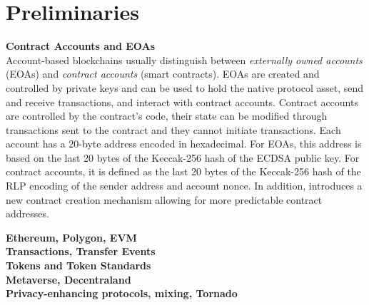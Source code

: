 \documentclass[12pt,a4paper,titlepage,oneside,english]{article}
\begin{document}




\section{Preliminaries}

\textbf{Contract Accounts and EOAs}\\
Account-based blockchains usually distinguish between \textit{externally owned accounts} (EOAs) and \textit{contract accounts} (smart contracts). EOAs are created and controlled by private keys and can be used to hold the native protocol asset, send and receive transactions, and interact with contract accounts. Contract accounts are controlled by the contract's code, their state can be modified through transactions sent to the contract and they cannot initiate transactions. \citep{buterin2014ethereum} \newline Each account has a 20-byte address encoded in hexadecimal. For EOAs, this address is based on the last 20 bytes of the Keccak-256 hash of the ECDSA public key. For contract accounts, it is defined as the last 20 bytes of the Keccak-256 hash of the RLP encoding of the sender address and account nonce. \citep{GW:14} \newline
In addition, \cite{eip1014} introduces a new contract creation mechanism allowing for more predictable contract addresses.%

\textbf{Ethereum, Polygon, EVM}\\

\textbf{Transactions, Transfer Events}\\

\textbf{Tokens and Token Standards}\\

\textbf{Metaverse, Decentraland} \\

\textbf{Privacy-enhancing protocols, mixing, Tornado} \\
\end{document}
